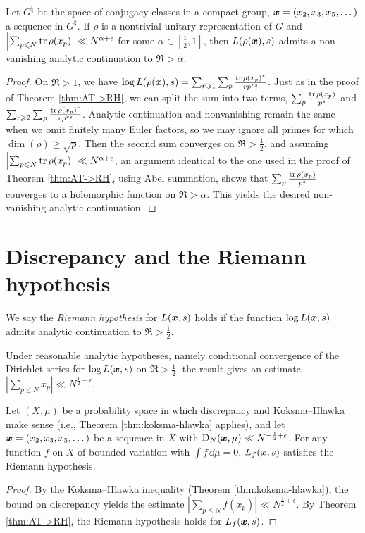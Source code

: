 \begin{theorem}\label{thm:AT->RH:gp}
Let $G^\natural$ be the space of conjugacy classes in a compact group, 
${\boldsymbol x} = (x_2,x_3,x_5,\dots)$ a sequence in $G^\natural$. If $\rho$ is a 
nontrivial unitary representation of $G$ and 
$\left| \sum_{p\leqslant N} \operatorname{tr} \rho(x_p)\right| \ll N^{\alpha+\epsilon}$ for 
some $\alpha\in \left[\frac 1 2,1\right]$, then $L(\rho({\boldsymbol x}),s)$ admits a 
non-vanishing analytic continuation to $\Re > \alpha$. 
\end{theorem}
\begin{proof}
On $\Re > 1$, we have 
$\log L(\rho({\boldsymbol x}),s) = \sum_{r\geqslant 1} \sum_p \frac{\operatorname{tr} \rho(x_p)^r}{r p^{r s}}$. 
Just as in the proof of Theorem \ref{thm:AT->RH}, we can split the sum into 
two terms, $\sum_p \frac{\operatorname{tr} \rho(x_p)}{p^s}$ and 
$\sum_{r\geqslant 2} \sum_p \frac{\operatorname{tr} \rho(x_p)^r}{r p^{r s}}$. Analytic 
continuation and nonvanishing remain the same when we omit finitely many Euler 
factors, so we may ignore all primes for which 
$\dim(\rho) \geqslant \sqrt p$. Then the second sum converges on 
$\Re > \frac 1 2$, and assuming 
$\left| \sum_{p\leqslant N} \operatorname{tr} \rho(x_p)\right| \ll N^{\alpha+\epsilon}$, an 
argument identical to the one used in the proof of Theorem \ref{thm:AT->RH}, 
using Abel summation, shows that 
$\sum_p \frac{\operatorname{tr} \rho(x_p)}{p^s}$ converges to a holomorphic function on 
$\Re > \alpha$. This yields the desired non-vanishing analytic continuation. 
\end{proof}





\section{Discrepancy and the Riemann hypothesis}

\begin{definition}
We say the \emph{Riemann hypothesis} for $L({\boldsymbol x},s)$ holds if the function 
$\log L({\boldsymbol x},s)$ admits analytic continuation to $\Re > \frac 1 2$. 
\end{definition}

Under reasonable analytic hypotheses, namely conditional convergence of 
the Dirichlet series for 
$\log L({\boldsymbol x},s)$ on $\Re > \frac 1 2$, the result 
\cite[II.1 Th.~10]{tenenbaum-1995} gives 
an estimate $|\sum_{p\leqslant N} x_p| \ll N^{\frac 1 2 + \epsilon}$. 

\begin{theorem}
Let $(X,\mu)$ be a probability space in which discrepancy and Koksma--Hlawka 
make sense (i.e., Theorem \ref{thm:koksma-hlawka} applies), and let 
${\boldsymbol x}=(x_2,x_3,x_5,\dots)$ be a sequence in $X$ with 
$\operatorname{D}_N({\boldsymbol x},\mu) \ll N^{-\frac 1 2+\epsilon}$. For any function $f$ on $X$ of 
bounded variation with $\int f\, \dd\mu = 0$, $L_f({\boldsymbol x},s)$ satisfies 
the Riemann hypothesis. 
\end{theorem}
\begin{proof}
By the Koksma--Hlawka inequality (Theorem \ref{thm:koksma-hlawka}), the bound 
on discrepancy yields the estimate 
$\left| \sum_{p\leqslant N} f(x_p)\right| \ll N^{\frac 1 2+\epsilon}$. 
By Theorem \ref{thm:AT->RH}, the Riemann hypothesis holds for $L_f({\boldsymbol x},s)$. 
\end{proof}

